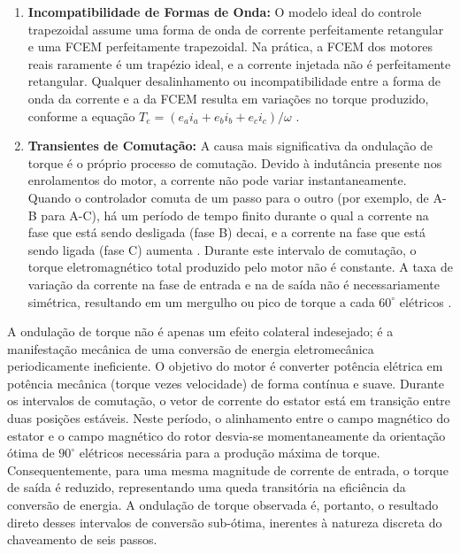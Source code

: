 \documentclass[12pt, a4paper, openright, oneside, brazilian]{abntex2}
\begin{document}
\begin{enumerate}
    \item \textbf{Incompatibilidade de Formas de Onda:} O modelo ideal do controle trapezoidal assume uma forma de onda de corrente perfeitamente retangular e uma FCEM perfeitamente trapezoidal. Na prática, a FCEM dos motores reais raramente é um trapézio ideal, e a corrente injetada não é perfeitamente retangular. Qualquer desalinhamento ou incompatibilidade entre a forma de onda da corrente e a da FCEM resulta em variações no torque produzido, conforme a equação $T_{e} = (e_{a}i_{a} + e_{b}i_{b} + e_{c}i_{c}) / \omega$ \cite{hendershot1994design}.

    \item \textbf{Transientes de Comutação:} A causa mais significativa da ondulação de torque é o próprio processo de comutação. Devido à indutância presente nos enrolamentos do motor, a corrente não pode variar instantaneamente. Quando o controlador comuta de um passo para o outro (por exemplo, de A-B para A-C), há um período de tempo finito durante o qual a corrente na fase que está sendo desligada (fase B) decai, e a corrente na fase que está sendo ligada (fase C) aumenta \cite{jahns1996pulsating, joice2013compensation}. Durante este intervalo de comutação, o torque eletromagnético total produzido pelo motor não é constante. A taxa de variação da corrente na fase de entrada e na de saída não é necessariamente simétrica, resultando em um mergulho ou pico de torque a cada $60^{\circ}$ elétricos \cite{choi1998commutation, chen2019commutation}.
\end{enumerate}

A ondulação de torque não é apenas um efeito colateral indesejado; é a manifestação mecânica de uma conversão de energia eletromecânica periodicamente ineficiente. O objetivo do motor é converter potência elétrica em potência mecânica (torque vezes velocidade) de forma contínua e suave. Durante os intervalos de comutação, o vetor de corrente do estator está em transição entre duas posições estáveis. Neste período, o alinhamento entre o campo magnético do estator e o campo magnético do rotor desvia-se momentaneamente da orientação ótima de $90^{\circ}$ elétricos necessária para a produção máxima de torque. Consequentemente, para uma mesma magnitude de corrente de entrada, o torque de saída é reduzido, representando uma queda transitória na eficiência da conversão de energia. A ondulação de torque observada é, portanto, o resultado direto desses intervalos de conversão sub-ótima, inerentes à natureza discreta do chaveamento de seis passos.
\end{document}
